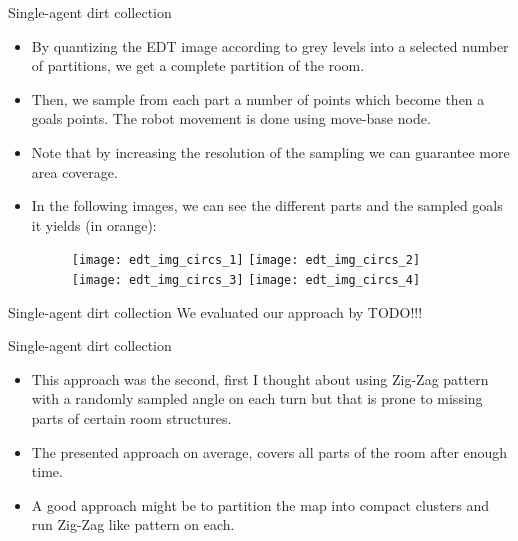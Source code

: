 \documentclass[10pt]{beamer}
\begin{document}
\begin{frame}{Single-agent dirt collection}

\graphicspath{{images/}}
\begin{itemize}
    \item By quantizing the EDT image according to grey levels into a selected number of partitions, we get a complete partition of the room.
    \item Then, we sample from each part a number of points which become then a goals points. The robot movement is done using move-base node.
    \item Note that by increasing the resolution of the sampling we can guarantee more area coverage.
    \item In the following images, we can see the different parts and the sampled goals it yields (in orange): 
    
    \bigskip
    \begin{figure}[htp]
    \texttt{[image: edt\_img\_circs\_1]}
    \texttt{[image: edt\_img\_circs\_2]}
    \texttt{[image: edt\_img\_circs\_3]}
    \texttt{[image: edt\_img\_circs\_4]}

    \label{fig:galaxy}
\end{figure}
    
\end{itemize}

\end{frame}


\begin{frame}{Single-agent dirt collection}
\bigskip 
We evaluated our approach by  TODO!!!
\end{frame}


\begin{frame}{Single-agent dirt collection}

\begin{itemize}
    \item This approach was the second, first I thought about using Zig-Zag pattern with a randomly sampled angle on each turn but that is prone to missing parts of certain room structures.
    \item The presented approach on average, covers all parts of the room after enough time.
    \item A good approach might be to partition the map into compact clusters and run Zig-Zag like pattern on each.
\end{itemize}

\end{frame}
\end{document}
